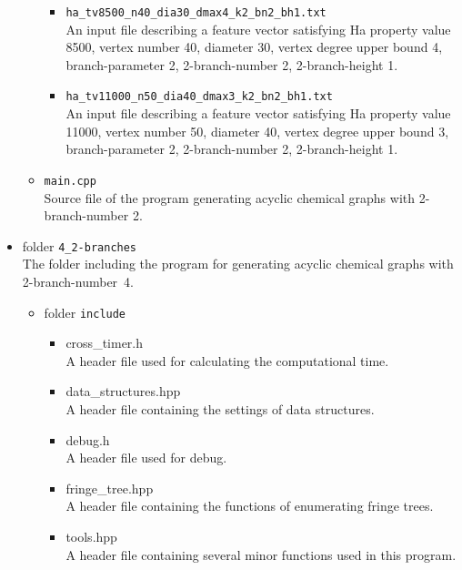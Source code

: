 \documentclass[11pt,titlepage,dvipdfmx,twoside]{article}
\begin{document}
\begin{itemize}
\begin{itemize}
\begin{itemize}
			\item{\tt ha\_tv8500\_n40\_dia30\_dmax4\_k2\_bn2\_bh1.txt}\\
				An input file describing a feature vector satisfying Ha property value 8500, 
				vertex number 40, diameter 30, vertex degree upper bound 4, branch-parameter 2,
				2-branch-number 2, 2-branch-height 1.
				
			\item{\tt ha\_tv11000\_n50\_dia40\_dmax3\_k2\_bn2\_bh1.txt}\\
			    An input file describing a feature vector satisfying Ha property value 11000, 
				vertex number 50, diameter 40, vertex degree upper bound 3, branch-parameter 2,
				2-branch-number 2, 2-branch-height 1.

		\end{itemize}
		
	\item {\tt main.cpp}\\
	Source file of the program generating acyclic chemical graphs with 2-branch-number 2.
	\end{itemize}
		
\item folder {\tt 4\_2-branches}\\
	The folder including the program for generating acyclic chemical graphs with 2-branch-number~4.
	\begin{itemize}
	\item folder {\tt include}
		\begin{itemize}
			\item{cross\_timer.h}\\
				A header file used for calculating the computational time.
				
			\item{data\_structures.hpp}\\
				A header file containing the settings of data structures.
				
			\item{debug.h}\\
				A header file used for debug.
				
			\item{fringe\_tree.hpp}\\
				A header file containing the functions of enumerating fringe trees.		
						
			\item{tools.hpp}\\
				A header file containing several minor functions used in this program.
				

\end{itemize}
\end{itemize}
\end{itemize}
\end{document}
